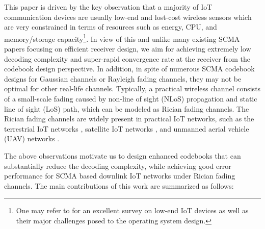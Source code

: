 \documentclass[journal]{IEEEtran}
\begin{document}
This paper is driven by the key observation that a majority of IoT communication devices  are usually low-end and lost-cost wireless sensors which are very constrained in terms of resources such as energy, CPU, and memory/storage capacity\footnote{One may refer to  \cite{HahmOperating} for an excellent survey on low-end IoT devices as well as their major challenges posed to the operating system design.}.
In view of this and unlike many existing SCMA papers focusing on efficient receiver design, we aim for achieving extremely low decoding complexity and super-rapid convergence rate at the receiver from the codebook design perspective. In addition, in spite of numerous SCMA codebook designs for Gaussian channels or Rayleigh fading channels, they may not be optimal for other real-life  channels.   Typically, a practical wireless channel consists of a  small-scale fading caused by non-line of sight (NLoS) propagation and static line of sight (LoS) path, which can be modeled as Rician fading channels.  The Rician fading channels are widely present  in practical IoT networks, such as the  terrestrial IoT networks \cite{ZhangPerformance,YuCost},   satellite IoT  networks \cite{5G_NR_s_iot,lutz1991land, vucetic1992channel,li2019asynchronous,gui2021scma,ZhangComplexity,WangIterative}, and unmanned aerial vehicle (UAV)  networks \cite{ErnestNOMA,WangTrajectory}. 

The above observations     motivate  us to design   enhanced codebooks  that  can substantially  reduce the decoding complexity, while   achieving good error   performance for SCMA based downlink IoT networks under Rician  fading channels. The main contributions of this work are summarized as follows:







\end{document}
